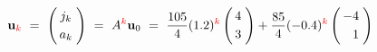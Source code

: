 \begin{frame}
\begin{itemize}
		\vspace{1mm}
		\[	
		\mathbf{u}_{\color{red}k}
		\ = \	
		\left(
		\begin{array}{@{\hspace{0.3\tabcolsep}}c@{\hspace{0.5\tabcolsep}}}
		j_k   \\[1mm]
		a_k 
		\end{array}
		\right) 
		\ = \				
		A^{\color{red}k}\mathbf{u}_0
		\ = \
		\frac{105}{4} (1.2)^{\color{red}k}
		\left(
		\begin{array}{@{\hspace{0.3\tabcolsep}}c@{\hspace{0.5\tabcolsep}}}
		4   \\[1mm]
		3 
		\end{array}
		\right) 
		+
		\frac{85}{4} (-0.4)^{\color{red}k}
		\left(
		\begin{array}{@{\hspace{0.3\tabcolsep}}r@{\hspace{0.5\tabcolsep}}}
		-4   \\[1mm]
		1 
		\end{array}
		\right) 
		\]
		
	\end{itemize}
	
\end{frame}


\subsection{}

